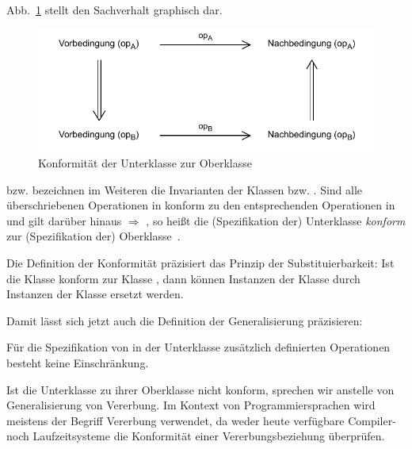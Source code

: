 Abb.~\ref{fig:konformitaet} stellt den Sachverhalt graphisch dar.

\begin{figure}[h!]
	\centering
	\includegraphics{Bilder/Kapitel-9/konformitaet.pdf}
	\vspace{\baselineskip} %
	\caption{Konformität der Unterklasse  zur Oberklasse }
	\label{fig:konformitaet}
\end{figure}

\pagebreak %

 bzw.  bezeichnen im Weiteren die Invarianten der Klassen  bzw. . Sind alle überschriebenen Operationen in  konform zu den entsprechenden Operationen in  und gilt darüber hinaus  $\Rightarrow$ , so heißt die (Spezifikation der) Unterklasse  \textit{konform} zur (Spezifikation der) Oberklasse~.

Die Definition der Konformität präzisiert das Prinzip der Substituierbarkeit: Ist die Klasse  konform zur Klasse , dann können Instanzen der Klasse  durch Instanzen der Klasse  ersetzt werden.

Damit lässt sich jetzt auch die Definition der Generalisierung präzisieren:


Für die Spezifikation von in der Unterklasse zusätzlich definierten Operationen \mbox{besteht} keine Einschränkung.

Ist die Unterklasse zu ihrer Oberklasse nicht konform,  sprechen wir anstelle von Generalisierung von Vererbung. Im Kontext von Programmiersprachen wird meistens der Begriff Vererbung verwendet, da weder heute verfügbare Compiler- noch Laufzeitsysteme die Konformität einer Vererbungsbeziehung überprüfen.

